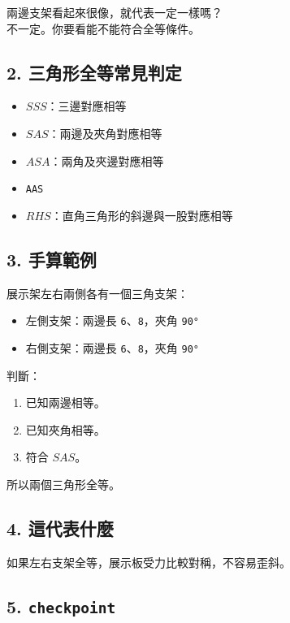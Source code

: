 \documentclass[
  chinese,
  12pt,
  a4paper,
  oneside]{article}
\providecommand{\tightlist}{%
  \setlength{\itemsep}{0pt}\setlength{\parskip}{0pt}}
\begin{document}
兩邊支架看起來很像，就代表一定一樣嗎？\\
不一定。你要看能不能符合全等條件。

\subsection{2.
三角形全等常見判定}\label{ux4e09ux89d2ux5f62ux5168ux7b49ux5e38ux898bux5224ux5b9a}

\begin{itemize}
\tightlist
\item
  \(SSS\)：三邊對應相等
\item
  \(SAS\)：兩邊及夾角對應相等
\item
  \(ASA\)：兩角及夾邊對應相等
\item
  \texttt{AAS}
\item
  \(RHS\)：直角三角形的斜邊與一股對應相等
\end{itemize}

\subsection{3. 手算範例}\label{ux624bux7b97ux7bc4ux4f8b-4}

展示架左右兩側各有一個三角支架：

\begin{itemize}
\tightlist
\item
  左側支架：兩邊長 \texttt{6}、\texttt{8}，夾角 \texttt{90°}
\item
  右側支架：兩邊長 \texttt{6}、\texttt{8}，夾角 \texttt{90°}
\end{itemize}

判斷：

\begin{enumerate}
\def\labelenumi{\arabic{enumi}.}
\tightlist
\item
  已知兩邊相等。
\item
  已知夾角相等。
\item
  符合 \(SAS\)。
\end{enumerate}

所以兩個三角形全等。

\subsection{4. 這代表什麼}\label{ux9019ux4ee3ux8868ux4ec0ux9ebc-1}

如果左右支架全等，展示板受力比較對稱，不容易歪斜。

\subsection{\texorpdfstring{5.
\texttt{checkpoint}}{5. checkpoint}}\label{checkpoint-5}
\end{document}
